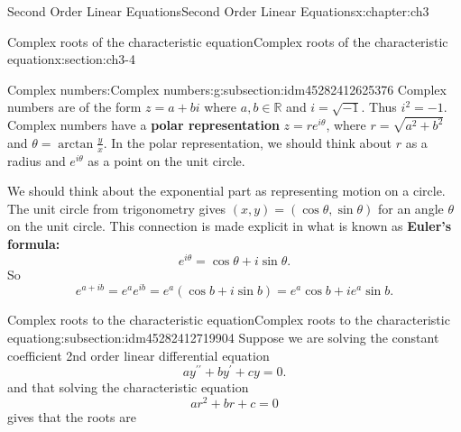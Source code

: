 \documentclass[oneside,10pt,]{book}
\newcommand{\terminology}[1]{\textbf{#1}}
\numberwithin{equation}{section}
\numberwithin{equation}{section}
\begin{document}
\begin{chapterptx}{Second Order Linear Equations}{}{Second Order Linear Equations}{}{}{x:chapter:ch3}
%
%
\typeout{************************************************}
\typeout{************************************************}
%
\begin{sectionptx}{Complex roots of the characteristic equation}{}{Complex roots of the characteristic equation}{}{}{x:section:ch3-4}
%
%
\typeout{************************************************}
\typeout{************************************************}
%
\begin{subsectionptx}{Complex numbers:}{}{Complex numbers:}{}{}{g:subsection:idm45282412625376}
Complex numbers are of the form \(z = a+bi\) where \(a,b\in\mathbb{R}\) and \(i=\sqrt{-1}\). Thus \(i^{2}=-1\). Complex numbers have a \terminology{polar representation} \(z = r e^{i\theta}\), where \(r = \sqrt{a^2 + b^2}\) and \(\theta = \arctan\frac{y}{x}\). In the polar representation, we should think about \(r\) as a radius and \(e^{i\theta}\) as a point on the unit circle.%
\par
We should think about the exponential part as representing motion on a circle. The unit circle from trigonometry gives \((x,y) = (\cos \theta, \sin \theta)\) for an angle \(\theta\) on the unit circle. This connection is made explicit in what is known as \terminology{Euler's formula:}%
\begin{equation*}
e^{i\theta}=\cos \theta+i\sin \theta.
\end{equation*}
So%
\begin{equation*}
e^{a+ib}=e^{a}e^{ib}=e^{a}\left(\cos b+i\sin b\right)=e^{a}\cos b+ie^{a}\sin b.
\end{equation*}
%
\end{subsectionptx}
%
%
\typeout{************************************************}
\typeout{************************************************}
%
\begin{subsectionptx}{Complex roots to the characteristic equation}{}{Complex roots to the characteristic equation}{}{}{g:subsection:idm45282412719904}
Suppose we are solving the constant coefficient 2nd order linear differential equation%
\begin{equation*}
ay^{\prime\prime}+by^{\prime}+cy=0.
\end{equation*}
and that solving the characteristic equation%
\begin{equation*}
ar^{2}+br+c=0
\end{equation*}
gives that the roots are%

\end{subsectionptx}
\end{sectionptx}
\end{chapterptx}
\end{document}
